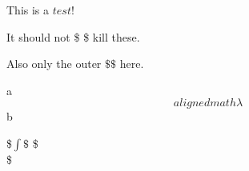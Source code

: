 This is a $test$!

It should not \$ \$ kill these.

Also only the outer $ \$\$$ here.

a$$alignedmath  λ $$b

$$$$$$$$
\$$∫  \$$
\$$$ $$\$
